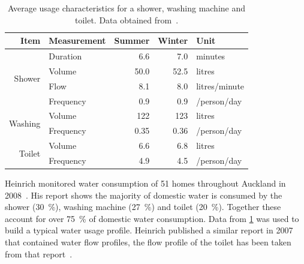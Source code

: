     \begin{table}
      \centering
      \begin{tabular}{r l|r|r|l}
        Item                    & Measurement & Summer & Winter & Unit\\
        \hline\hline
        \multirow{4}{*}{Shower} & Duration    & 6.6    & 7.0    & minutes\\
                                & Volume      & 50.0   & 52.5   & litres\\
                                & Flow        & 8.1    & 8.0    & litres/minute\\
                                & Frequency   & 0.9    & 0.9    & /person/day\\
        \hline
        \multirow{2}{*}{Washing}& Volume      & 122    & 123    & litres\\
                                & Frequency   & 0.35   & 0.36   & /person/day\\
        \hline
        \multirow{2}{*}{Toilet} & Volume      & 6.6    & 6.8    & litres\\
                                & Frequency   & 4.9    & 4.5    & /person/day\\
      \end{tabular}
      \caption{
          \label{tab:consumption_figures}
          Average usage characteristics for a shower, washing machine and toilet.
          Data obtained from~\cite{Heinrich2008}.
      }
    \end{table}
    Heinrich monitored water consumption of 51 homes throughout Auckland in 2008~\cite{Heinrich2008}.
    His report shows the majority of domestic water is consumed by the shower (\SI{30}{\percent}), washing machine (\SI{27}{\percent}) and toilet (\SI{20}{\percent}).
    Together these account for over \SI{75}{\percent} of domestic water consumption.
    Data from \cref{tab:consumption_figures} was used to build a typical water usage profile.
    Heinrich published a similar report in 2007 that contained water flow profiles, the flow profile of the toilet has been taken from that report~\cite{Heinrich2007}.

